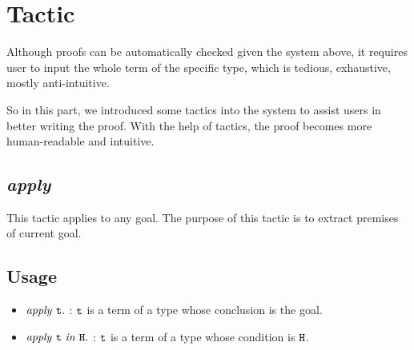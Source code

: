 \section{Tactic}
Although proofs can be automatically checked given the system above, it requires user to input the whole
term of the specific type, which is tedious, exhaustive, mostly anti-intuitive.\par
So in this part, we introduced some tactics into the system 
to assist users in better writing the proof. With the help of
tactics, the proof becomes more human-readable and intuitive.\par

\subsection{\it apply}
This tactic applies to any goal. The purpose of this tactic is to extract premises of
current goal.

\subsection*{Usage}
\begin{itemize}
\item $\it apply\ \tt t.$ : $\tt t$ is a term of a type whose conclusion is the goal.
\item $\it apply\ \tt t\ \it in\ \tt H.$ : $\tt t$ is a term of a type whose condition is $\tt H$.
\end{itemize}

